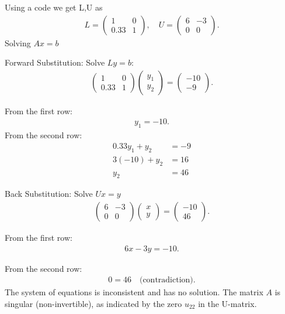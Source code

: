 \documentclass{beamer}
\theoremstyle{remark}
\newcommand{\myvec}[1]{\ensuremath{\begin{pmatrix}#1\end{pmatrix}}}
\numberwithin{equation}{section}
\begin{document}
\begin{frame}
    Using a code we get L,U as 
\begin{align}
L = \myvec{1 & 0 \\ 0.33 & 1}, \quad
U = \myvec{6 & -3 \\ 0 & 0}.
\end{align}
Solving $A{x} = {b}$

Forward Substitution: Solve $Ly = b$:
\begin{align}
\myvec{1 & 0 \\ 0.33 & 1}
\myvec{y_1 \\ y_2}
=
\myvec{-10 \\ -9}.
\end{align}

From the first row:
\begin{align}
y_1 = -10.
\end{align}
From the second row:
\begin{align}
0.33y_1 + y_2 &= -9 \\
3(-10) + y_2 &= 16 \\
y_2 &= 46
\end{align}
\end{frame}
\begin{frame}
    Back Substitution: Solve $Ux = y$ 
\begin{align}
\myvec{6 & -3 \\ 0 & 0}
\myvec{x \\ y}
=
\myvec{-10 \\ 46}.
\end{align}

From the first row:
\begin{align}
6x - 3y = -10.
\end{align}

From the second row:
\begin{align}
0 = 46 \quad \text{(contradiction)}.
\end{align}
The system of equations is inconsistent and has no solution. The matrix $A$ is singular (non-invertible), as indicated by the zero $u_{22}$ in the U-matrix.
\end{frame}
\end{document}

